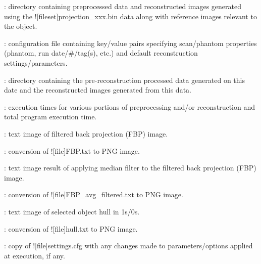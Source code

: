 \begin{tcbenvironment}
\begin{tcbenumbox}
\begin{ThinEnum}
\begin{ThinEnum}
\begin{ThinEnum}
\begin{ThinEnum}
\begin{ThinEnum}
\begin{ThinEnum}
\begin{ThinEnum}
                                \item {} : directory containing preprocessed data and reconstructed images generated using the \docentry![fileset]{projection\_xxx.bin} data along with reference images relevant to the object.
                               \begin{ThinEnum}
                                    \item {} : configuration file containing key/value pairs specifying scan/phantom properties
                                    (phantom, run date/\#/tag(s), etc.) and default reconstruction settings/parameters.
                                    \item {} : directory containing the pre-reconstruction processed data generated on this date and the reconstructed images generated from this data.
                                    \begin{ThinEnum}
                                            \item {} : execution times for various portions of preprocessing and/or reconstruction and total program execution time.
                                            \item {} : text image of filtered back projection (FBP) image.
                                            \item {} : conversion of \docentry![file]{FBP.txt} to PNG image.
                                            \item {} : text image result of applying median filter to the filtered back projection (FBP) image.
                                            \item {} : conversion of \docentry![file]{FBP\_avg\_filtered.txt} to PNG image.
                                            \item {} : text image of selected object hull in 1s/0s.
                                            \item {} : conversion of \docentry![file]{hull.txt} to PNG image.
                                            \item {} : copy of \docentry![file]{settings.cfg} with any changes made to parameters/options applied at execution, if any.

\end{ThinEnum}
\end{ThinEnum}
\end{ThinEnum}
\end{ThinEnum}
\end{ThinEnum}
\end{ThinEnum}
\end{ThinEnum}
\end{ThinEnum}
\end{ThinEnum}
\end{tcbenumbox}
\end{tcbenvironment}
